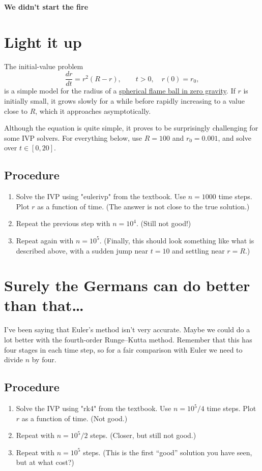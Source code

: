 \documentclass[11pt,twoside]{article}
\begin{document}
\begin{center}
  \Large
  \bf We didn't start the fire
\end{center}

\section{Light it up}

The initial-value problem
\begin{equation}
  \label{eq:fire}
  \frac{dr}{dt} = r^2(R-r), \qquad t > 0, \quad r(0)=r_0,
\end{equation}
is a simple model for the radius of a \href{https://youtu.be/Q58-la_yAB4}{spherical flame ball in zero gravity}. If $r$ is initially small, it grows slowly for a while before rapidly increasing to a value close to $R$, which it approaches asymptotically.

Although the equation is quite simple, it proves to be surprisingly challenging for some IVP solvers. For everything below, use $R=100$ and $r_0=0.001$, and solve over $t\in [0,20]$.

\subsection*{Procedure}

\begin{enumerate}
  \item Solve the IVP using "eulerivp" from the textbook. Use $n=1000$ time steps. Plot $r$ as a function of time. (The answer is not close to the true solution.)
  \item Repeat the previous step with $n=10^4$. (Still not good!) 
  \item Repeat again with $n=10^5$. (Finally, this should look something like what is described above, with a sudden jump near $t=10$ and settling near $r=R$.)
\end{enumerate}

\section{Surely the Germans can do better than that\ldots}

I've been saying that Euler's method isn't very accurate. Maybe we could do a lot better with the fourth-order Runge--Kutta method. Remember that this has four stages in each time step, so for a fair comparison with Euler we need to divide $n$ by four. 

\subsection*{Procedure}
\begin{enumerate}
  \item Solve the IVP using "rk4" from the textbook. Use $n=10^5/4$ time steps. Plot $r$ as a function of time. (Not good.)
  \item Repeat with $n=10^5/2$ steps. (Closer, but still not good.)
  \item Repeat with $n=10^5$ steps. (This is the first ``good'' solution you have seen, but at what cost?) 
\end{enumerate}
\end{document}
